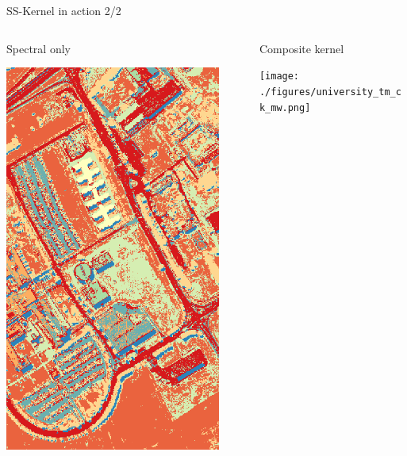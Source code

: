 \documentclass[10pt,aspectratio=1610,,color={dvipsnames,usenames,table},table]{beamer}
\begin{document}
\begin{frame}[label={sec:orgf68013a}]{SS-Kernel in action 2/2}
\begin{columns}
\begin{column}{0.3\columnwidth}
\begin{block}{Spectral only}
\begin{center}
\includegraphics[width=0.9\textwidth]{./figures/mrf_labels.png}
\end{center}
\end{block}
\end{column}

\begin{column}{0.3\columnwidth}
\begin{block}{Composite kernel}
\begin{center}
\texttt{[image: ./figures/university\_tm\_ck\_mw.png]}
\end{center}
\end{block}
\end{column}


\end{columns}
\end{frame}
\end{document}
